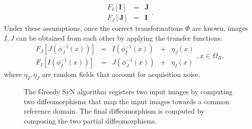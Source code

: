 \begin{equation}\label{eq:intensity_transfers}
    \begin{array}{ccccc}
        F_{I}\left[\mathbf{I}\right] &=& \mathbf{J}\\
        F_{J}\left[\mathbf{J}\right] &=& \mathbf{I}
    \end{array}.
\end{equation}
Under these assumptions, once the correct transformations $\Phi$ are known, images $I, J$ can be obtained from each other by applying the transfer functions:
\begin{equation}\label{eq:SyNEM_gom_ref}
    \begin{array}{ccccc}
        F_{J}\left[J(\phi_{J}^{-1}(x))\right] &=& I(\phi_{I}^{-1}(x)) &+& \eta_{J}(x)\\
        F_{I}\left[I(\phi_{I}^{-1}(x))\right] &=& J(\phi_{J}^{-1}(x)) &+& \eta_{I}(x)
    \end{array}, x\in\Omega_{R},
\end{equation}
where $\eta_{I}, \eta_{J}$ are random fields that account for acquisition noise.

\begin{figure}[H]
\centering
{}
\caption{The Greedy SyN algorithm registers two input images by computing two diffeomorphisms that map the input images towards a common reference domain. The final
diffeomorphism is computed by composing the two partial diffeomorphisms.}
\label{fig:syn_overview}
\end{figure}

